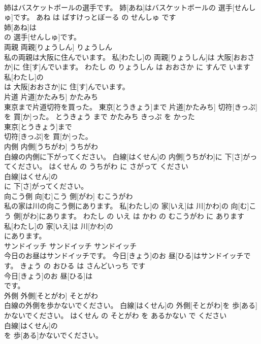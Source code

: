 \documentclass[8pt]{extreport}
\begin{document}
\begin{CJK}{UTF8}{min}
\\	姉はバスケットボールの選手です。	姉[あね]はバスケットボールの 選手[せんしゅ]です。	あね は ばすけっとぼーる の せんしゅ です	
\\	姉[あね]は
\\	の 選手[せんしゅ]です。		
\\	両親	両親[りょうしん]	りょうしん	
\\	私の両親は大阪に住んでいます。	私[わたし]の 両親[りょうしん]は 大阪[おおさか]に 住[す]んでいます。	わたし の りょうしん は おおさか に すんで います	
\\	私[わたし]の
\\	は 大阪[おおさか]に 住[す]んでいます。		
\\	片道	片道[かたみち]	かたみち	
\\	東京まで片道切符を買った。	東京[とうきょう]まで 片道[かたみち] 切符[きっぷ]を 買[か]った。	とうきょう まで かたみち きっぷ を かった	
\\	東京[とうきょう]まで
\\	切符[きっぷ]を 買[か]った。		
\\	内側	内側[うちがわ]	うちがわ	
\\	白線の内側に下がってください。	白線[はくせん]の 内側[うちがわ]に 下[さ]がってください。	はくせん の うちがわ に さがって ください	
\\	白線[はくせん]の
\\	に 下[さ]がってください。		
\\	向こう側	向[む]こう 側[がわ]	むこうがわ	
\\	私の家は川の向こう側にあります。	私[わたし]の 家[いえ]は 川[かわ]の 向[む]こう 側[がわ]にあります。	わたし の いえ は かわ の むこうがわ に あります	
\\	私[わたし]の 家[いえ]は 川[かわ]の
\\	にあります。		
\\	サンドイッチ	サンドイッチ	サンドイッチ	
\\	今日のお昼はサンドイッチです。	今日[きょう]のお 昼[ひる]はサンドイッチです。	きょう の おひる は さんどいっち です	
\\	今日[きょう]のお 昼[ひる]は
\\	です。		
\\	外側	外側[そとがわ]	そとがわ	
\\	白線の外側を歩かないでください。	白線[はくせん]の 外側[そとがわ]を 歩[ある]かないでください。	はくせん の そとがわ を あるかない で ください	
\\	白線[はくせん]の
\\	を 歩[ある]かないでください。		

\end{CJK}
\end{document}
